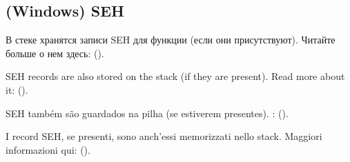 \subsection{(Windows) SEH}

\ifdefined\RUSSIAN
В стеке хранятся записи \ac{SEH} для функции (если они присутствуют).
Читайте больше о нем здесь: ().
\fi %

\ifdefined\ENGLISH
\ac{SEH} records are also stored on the stack (if they are present).
Read more about it: ().
\fi %

\ifdefined\BRAZILIAN
\ac{SEH} também são guardados na pilha (se estiverem presentes).
\PTBRph{}: ().
\fi %

\ifdefined\ITALIAN
I record \ac{SEH}, se presenti, sono anch'essi memorizzati nello stack.
Maggiori informazioni qui: ().
\fi %
